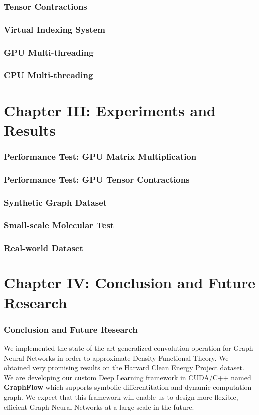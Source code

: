 \documentclass{beamer}
\begin{document}
\begin{frame}
\frametitle{Tensor Contractions}
\end{frame}

\begin{frame}
\frametitle{Virtual Indexing System}
\end{frame}

\begin{frame}
\frametitle{GPU Multi-threading}
\end{frame}

\begin{frame}
\frametitle{CPU Multi-threading}
\end{frame}

\section{Chapter III: Experiments and Results}

\begin{frame}
\frametitle{Performance Test: GPU Matrix Multiplication}
\end{frame}

\begin{frame}
\frametitle{Performance Test: GPU Tensor Contractions}
\end{frame}

\begin{frame}
\frametitle{Synthetic Graph Dataset}
\end{frame}

\begin{frame}
\frametitle{Small-scale Molecular Test}
\end{frame}

\begin{frame}
\frametitle{Real-world Dataset}
\end{frame}

\section{Chapter IV: Conclusion and Future Research}

\begin{frame}
\frametitle{Conclusion and Future Research}
\begin{justify}
We implemented the state-of-the-art generalized convolution operation for Graph Neural Networks in order to approximate Density Functional Theory. We obtained very promising results on the Harvard Clean Energy Project dataset.
$$$$
We are developing our custom Deep Learning framework in CUDA/C++ named \textbf{GraphFlow} which supports symbolic differentitation and dynamic computation graph. We expect that this framework will enable us to design more flexible, efficient Graph Neural Networks at a large scale in the future.
\end{justify}
\end{frame}
\end{document}
